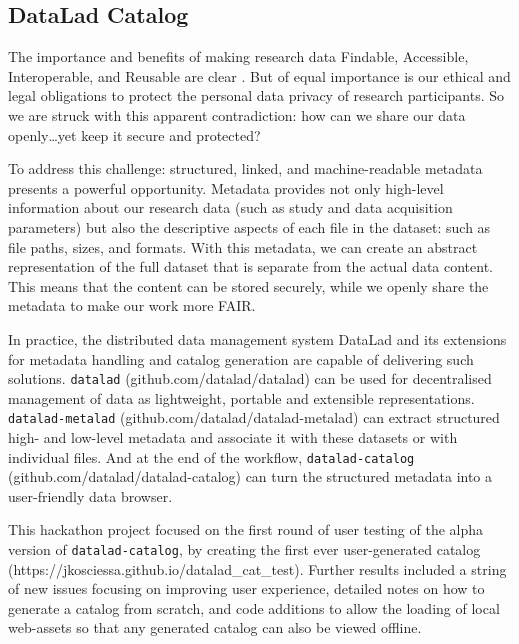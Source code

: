 \documentclass[../main.tex]{subfiles}
\begin{document}
\subsection{DataLad Catalog}

%

The importance and benefits of making research data Findable, Accessible, Interoperable, and Reusable are clear \parencite{Wilkinson2016}. But of equal importance is our ethical and legal obligations to protect the personal data privacy of research participants. So we are struck with this apparent contradiction: how can we share our data openly…yet keep it secure and protected?

To address this challenge: structured, linked, and machine-readable metadata presents a powerful opportunity. Metadata provides not only high-level information about our research data (such as study and data acquisition parameters) but also the descriptive aspects of each file in the dataset: such as file paths, sizes, and formats. With this metadata, we can create an abstract representation of the full dataset that is separate from the actual data content. This means that the content can be stored securely, while we openly share the metadata to make our work more FAIR.

In practice, the distributed data management system DataLad \parencite{Halchenko2021} and its extensions for metadata handling and catalog generation are capable of delivering such solutions. \texttt{datalad} (github.com/datalad/datalad) can be used for decentralised management of data as lightweight, portable and extensible representations. \texttt{datalad-metalad} (github.com/datalad/datalad-metalad) can extract structured high- and low-level metadata and associate it with these datasets or with individual files. And at the end of the workflow, \texttt{datalad-catalog} (github.com/datalad/datalad-catalog) can turn the structured metadata into a user-friendly data browser.

This hackathon project focused on the first round of user testing of the alpha version of \texttt{datalad-catalog}, by creating the first ever user-generated catalog (https://jkosciessa.github.io/datalad_cat_test). Further results included a string of new issues focusing on improving user experience, detailed notes on how to generate a catalog from scratch, and code additions to allow the loading of local web-assets so that any generated catalog can also be viewed offline.
\end{document}
